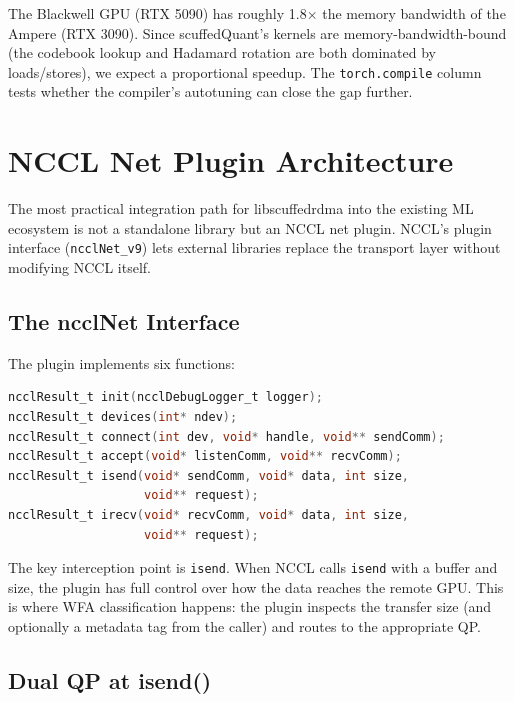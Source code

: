 \documentclass[11pt,letterpaper]{article}
\begin{document}
The Blackwell GPU (RTX 5090) has roughly 1.8$\times$ the memory bandwidth of the Ampere (RTX 3090). Since scuffedQuant's kernels are memory-bandwidth-bound (the codebook lookup and Hadamard rotation are both dominated by loads/stores), we expect a proportional speedup. The \texttt{torch.compile} column tests whether the compiler's autotuning can close the gap further.

\section{NCCL Net Plugin Architecture}
\label{sec:nccl_plugin}

The most practical integration path for libscuffedrdma into the existing ML ecosystem is not a standalone library but an NCCL net plugin. NCCL's plugin interface (\texttt{ncclNet\_v9}) lets external libraries replace the transport layer without modifying NCCL itself.

\subsection{The ncclNet Interface}

The plugin implements six functions:

\begin{lstlisting}[language=C, caption={Core ncclNet plugin functions.}]
ncclResult_t init(ncclDebugLogger_t logger);
ncclResult_t devices(int* ndev);
ncclResult_t connect(int dev, void* handle, void** sendComm);
ncclResult_t accept(void* listenComm, void** recvComm);
ncclResult_t isend(void* sendComm, void* data, int size,
                   void** request);
ncclResult_t irecv(void* recvComm, void* data, int size,
                   void** request);
\end{lstlisting}

The key interception point is \texttt{isend}. When NCCL calls \texttt{isend} with a buffer and size, the plugin has full control over how the data reaches the remote GPU. This is where WFA classification happens: the plugin inspects the transfer size (and optionally a metadata tag from the caller) and routes to the appropriate QP.

\subsection{Dual QP at isend()}
\end{document}
